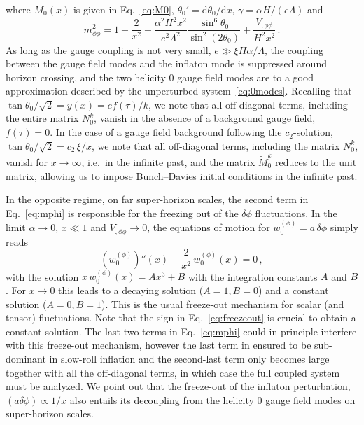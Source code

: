 where $M_0(x)$ is given in Eq.~\eqref{eq:M0}, $\theta_0' = \textrm{d} \theta_0 / \textrm{d}x $, $\gamma = \alpha H  / (e \Lambda) $ and
\begin{equation}
 m_{\phi \phi}^2 = 1 - \frac{2}{x^2} + \frac{\alpha^2 H^2 x^2}{e^2 \Lambda^2} \frac{ \sin^6 \theta_0}{\sin^2\left(2 \theta_0\right)} + \frac{V_{, \phi \phi}}{H^2 x^2	}\,.
 \label{eq:mphi}
\end{equation}
As long as the gauge coupling is not very small, $e \gg \xi H  \alpha/\Lambda$, the coupling between the gauge field modes and the inflaton mode is suppressed around horizon crossing, and the two helicity 0 gauge field modes are to a good approximation described by the unperturbed system~\eqref{eq:0modes}. 
Recalling that $\tan \theta_0/\sqrt{2} = y(x) = e f(\tau)/k$, we note that all off-diagonal terms, including the entire matrix $N_0^k$, vanish in the absence of a background gauge field, $f(\tau) = 0$. In the case of a gauge field background following the $c_2$-solution, $\tan \theta_0/\sqrt{2} = c_2 \, \xi / x$, we note that all off-diagonal terms, including the matrix $N_0^k$, vanish for $x \rightarrow \infty$, i.e.\ in the infinite past, and the matrix $\tilde M_0^k$ reduces to the unit matrix, allowing us to impose Bunch--Davies initial conditions in the infinite past. 
 

In the opposite regime, on far super-horizon scales, the second term in Eq.~\eqref{eq:mphi} is responsible for the freezing out of the $\delta \phi$ fluctuations. In the limit $\alpha \rightarrow 0$, $x \ll1$ and $V_{,\phi\phi} \rightarrow 0$, the equations of motion for $w_0^{(\phi)} = a \, \delta \phi$ simply reads
\begin{equation}
 \left(w_0^{(\phi)}\right)''(x)  - \frac{2}{x^2} \,  w_0^{(\phi)}(x) = 0 \,,
 \label{eq:freezeout}
\end{equation}
with the solution $x \, w_0^{(\phi)}(x) = A x^3 + B $ with the integration constants $A$ and $B$. For $x \rightarrow 0$ this leads to a decaying solution ($A = 1, B = 0$) and a constant solution ($A = 0, B = 1$). This is the usual freeze-out mechanism for scalar (and tensor) fluctuations. Note that the sign in Eq.~\eqref{eq:freezeout} is crucial to obtain a constant solution. {The last two terms in Eq.~\eqref{eq:mphi} could in principle interfere with this freeze-out mechanism, however the last term in ensured to be sub-dominant in slow-roll inflation and the second-last term only becomes large together with all the off-diagonal terms, in which case the full coupled system must be analyzed.} {We point out that the freeze-out of the inflaton perturbation, $(a \delta \phi) \propto 1/x$ also entails its decoupling from the helicity 0 gauge field modes on super-horizon scales. }


